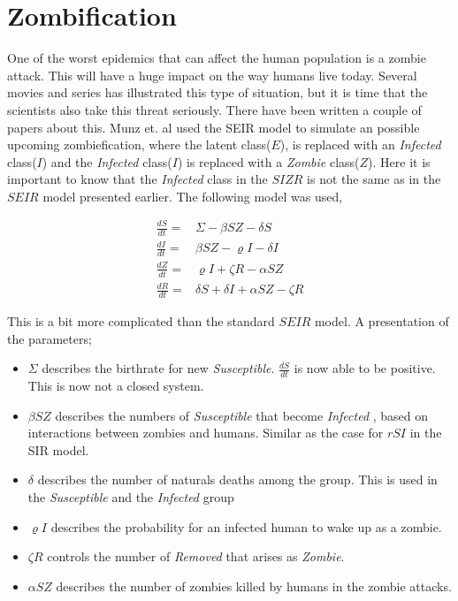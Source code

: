 \documentclass[%
twoside,                 %
final,                   %
10pt]{article}
\begin{document}
\section{Zombification}
One of the worst epidemics that can affect the human population is a zombie attack. This will have a huge impact on the way humans live today. Several movies and series has illustrated this type of situation, but it is time that the scientists also take this threat seriously. There have been written a couple of papers about this. Munz et. al\cite{munz2009zombies} used the SEIR model to simulate an possible upcoming zombiefication, where the latent class($E$), is replaced with an \emph{Infected} class($I$) and the \emph{Infected} class($I$) is replaced with a \emph{Zombie} class($Z$). Here it is important to know that the \emph{Infected} class in the $SIZR$ is not the same as in the $SEIR$ model presented earlier. The following model was used,

\begin{align*}
\frac{dS}{dt} =& \Sigma -\beta SZ - \delta S \\
\frac{dI}{dt} =& \beta SZ - \varrho I - \delta I\\
\frac{dZ}{dt} =& \varrho I + \zeta R - \alpha SZ\\
\frac{dR}{dt} =& \delta S + \delta I + \alpha SZ - \zeta R
\end{align*}

This is a bit more complicated than the standard $SEIR$ model. A presentation of the parameters;
\begin{itemize}
\item $\Sigma$ describes the birthrate for new \emph{Susceptible}. $\frac{dS}{dt}$ is now able to be positive. This is now not a closed system. 

\item $\beta SZ$ describes the numbers of \emph{Susceptible} that become \emph{Infected} , based on interactions between zombies and humans. Similar as the case for $rSI$ in the SIR model. 

\item $\delta$ describes the number of naturals deaths among the group. This is used in the \emph{Susceptible} and the \emph{Infected} group

\item $\varrho I$ describes the probability for an infected human to wake up as a zombie.

\item $\zeta R$ controls the number of \emph{Removed} that arises as \emph{Zombie}. 

\item $\alpha SZ$ describes the number of zombies killed by humans in the zombie attacks. 
\end{itemize}
\end{document}
